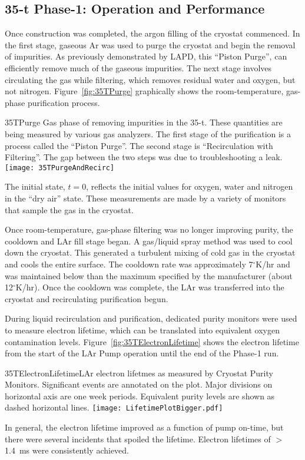 \subsection{35-t Phase-1: Operation and Performance} 
Once construction was completed, the argon filling of the cryostat
commenced.  In the first stage, gaseous Ar was used to purge the
cryostat and begin the removal of impurities.  As previously
demonstrated by LAPD, this ``Piston Purge'', can efficiently remove
much of the gaseous impurities.  The next stage involves circulating
the gas while filtering, which removes residual water and oxygen, but
not nitrogen.  Figure~\ref{fig:35TPurge} graphically shows the
room-temperature, gas-phase purification process.  
\begin{cdrfigure}{35TPurge}
{Gas phase of removing impurities in the 35-t. These quantities are 
being measured by various gas analyzers. The first stage of the 
purification is a process called the ``Piston Purge''.  The second 
stage is ``Recirculation with Filtering''. The gap between the two 
steps was due to troubleshooting a leak.}
  \texttt{[image: 35TPurgeAndRecirc]}
\end{cdrfigure}
The initial state, $t=0$, reflects the initial values for oxygen,
water and nitrogen in the ``dry air'' state.  These measurements are
made by a variety of monitors that sample the gas in the cryostat.


Once room-temperature, gas-phase filtering was no longer improving
purity, the cooldown and LAr fill stage began.  A gas/liquid spray
method was used to cool down the cryostat.  This generated a turbulent
mixing of cold gas in the cryostat and cools the entire surface.  The
cooldown rate was approximately 7$^\circ$K/hr and was maintained below
than the maximum specified by the manufacturer (about 12$^\circ$K/hr).
Once the cooldown was complete, the LAr was transferred into the
cryostat and recirculating purification begun.

During liquid recirculation and purification, dedicated
purity monitors were used to measure electron lifetime, which can 
be translated into equivalent oxygen contamination levels.
Figure~\ref{fig:35TElectronLifetime} shows the electron lifetime from the start of the
LAr Pump operation until the end of the Phase-1 run. 
\begin{cdrfigure}{35TElectronLifetime}{LAr electron lifetmes as measured by 
Cryostat Purity Monitors. Significant events are annotated on the plot. Major divisions on horizontal axis 
are one week periods. Equivalent purity levels are shown as dashed horizontal lines.}
  \texttt{[image: LifetimePlotBigger.pdf]}
\end{cdrfigure}
In general, the electron lifetime improved as a function of pump 
on-time, but there were several incidents that spoiled the lifetime.
Electron lifetimes of $>$1.4~ms were consistently achieved.



